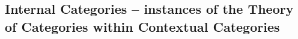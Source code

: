 \documentclass[10pt,a4paper]{article}
\theoremstyle{remark}
\begin{document}
\subsection{Internal Categories -- instances of the Theory of Categories within Contextual Categories}
\label{categoriesinstanceexample}


%

% 


\end{document}
